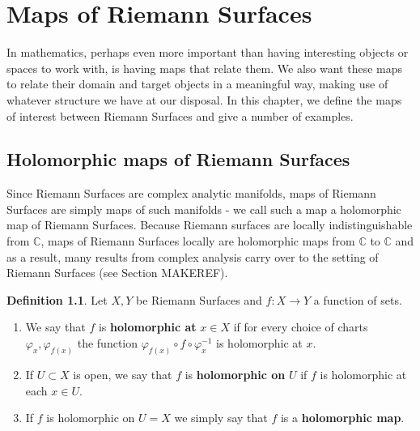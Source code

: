 \documentclass[12pt]{book}%
\theoremstyle{plain}
\theoremstyle{definition}
\newtheorem{definition}[theorem]{Definition}
\theoremstyle{remark}
\def\to{\rightarrow}
\def\bC{{\mathbb{C}}}
\begin{document}





\chapter{Maps of Riemann Surfaces}

In mathematics, perhaps even more important than having interesting objects or spaces to work with, is having maps that relate them. We also want these maps to relate their domain and target objects in a meaningful way, making use of whatever structure we have at our disposal. In this chapter, we define the maps of interest between Riemann Surfaces and give a number of examples.

\section{Holomorphic maps of Riemann Surfaces}

Since Riemann Surfaces are complex analytic manifolds, maps of Riemann Surfaces are simply maps of such manifolds - we call such a map a holomorphic map of Riemann Surfaces. Because Riemann surfaces are locally indistinguishable from $\bC$, maps of Riemann Surfaces locally are holomorphic maps from $\bC$ to $\bC$ and as a result, many results from complex analysis carry over to the setting of Riemann Surfaces (see Section MAKEREF). 



\begin{definition}
\label{holomorphicMapsOfRS}
Let $X,Y$ be Riemann Surfaces and $f:X \to Y$ a function of sets. 
\begin{enumerate}
\item We say that $f$ is \textbf{holomorphic at} $x\in X$ if for every choice of charts $\varphi_x, \varphi_{f(x)}$ the function $\varphi_{f(x)} \circ f \circ \varphi_x^{-1}$ is holomorphic at $x$.

\item If $U\subset X$ is open, we say that $f$ is \textbf{holomorphic on }$U$ if $f$ is holomorphic at each $x\in U$.

\item If $f$ is holomorphic on $U=X$ we simply say that $f$ is a \textbf{holomorphic map}.
\end{enumerate}
\end{definition}
\end{document}
